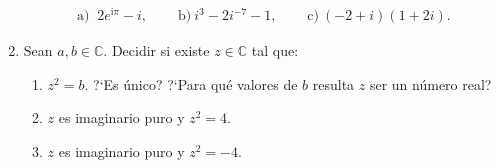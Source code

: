 \documentclass[12pt,spanish,makeidx]{amsbook}
\begin{document}
\begin{enumerate}
 $$\begin{array}{lll}
 \text{a) }\ 2e^{\mathrm{i}\pi}-i,  \quad & \text{ b)} \  i^3 - 2i^{-7} -1, \quad &\text{ c)}\ (-2+i) (1+2i).
  \end{array}$$

\vspace{.5cm}

\item Sean $a,b\in\mathbb{C}$. Decidir si existe $z \in \mathbb{C}$ tal que:
\begin{enumerate}
  \item $z^2=b$. ?`Es \'unico? ?`Para qu\'e valores de $b$ resulta $z$ ser un n\'umero real?
  \item $z$ es imaginario puro y $z^2=4$.
  \item $z$ es imaginario puro y $z^2=-4$.
\end{enumerate}


\end{enumerate}
\end{document}
